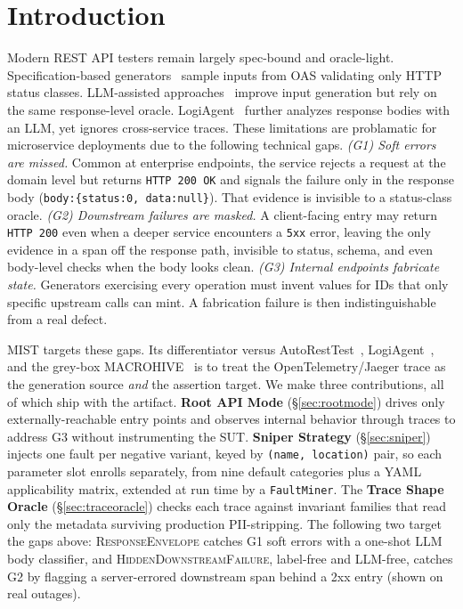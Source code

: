 \documentclass[sigconf,screen,review]{acmart}
\begin{document}
\maketitle

\section{Introduction}\label{sec:intro}

Modern REST API testers remain largely spec-bound and oracle-light. Specification-based generators~\cite{Arcuri2019EvoMasterTOSEM,Atlidakis2019RESTler,MartinLopez2021RESTest,Liu2022MoRest,Kim2023ARATRL,HatfieldDodds2022Schemathesis} sample inputs from  OAS validating only HTTP status classes. LLM-assisted approaches~\cite{Kim2024RESTGPT,Kim2025LlamaRestTest,Stennett2025AutoRestTest} improve input generation but rely on the same response-level oracle. LogiAgent~\cite{Zhang2025LogiAgent} further analyzes response bodies with an LLM, yet ignores cross-service traces. These limitations are problamatic for microservice deployments due to the following technical gaps. \emph{(G1) Soft errors are missed.} Common at enterprise endpoints, the service rejects a request at the domain level but returns \texttt{HTTP 200 OK} and signals the failure only in the response body (\texttt{body:\{status:0, data:null\}}). That evidence is invisible to a status-class oracle. \emph{(G2) Downstream failures are masked.} A client-facing entry may return \texttt{HTTP 200} even when a deeper service encounters a \texttt{5xx} error, leaving the only evidence in a span off the response path, invisible to status, schema, and even body-level checks when the body looks clean. \emph{(G3) Internal endpoints fabricate state.} Generators exercising every operation must invent values for IDs that only specific upstream calls can mint. A fabrication failure is then indistinguishable from a real defect.

MIST targets these gaps. Its differentiator versus AutoRestTest~\cite{Stennett2025AutoRestTest}, LogiAgent~\cite{Zhang2025LogiAgent}, and the grey-box MACROHIVE~\cite{Giamattei2022MACROHIVE} is to treat the OpenTelemetry/Jaeger trace as the generation source \emph{and} the assertion target. We make three contributions, all of which ship with the artifact. \textbf{Root API Mode} (\S\ref{sec:rootmode}) drives only externally-reachable entry points and observes internal behavior through traces to address G3 without instrumenting the SUT. \textbf{Sniper Strategy} (\S\ref{sec:sniper}) injects one fault per negative variant, keyed by \texttt{(name, location)} pair, so each parameter slot enrolls separately, from nine default categories plus a YAML applicability matrix, extended at run time by a \texttt{FaultMiner}. The \textbf{Trace Shape Oracle} (\S\ref{sec:traceoracle}) checks each trace against invariant families that read only the metadata surviving production PII-stripping. The following two target the gaps above: \textsc{ResponseEnvelope} catches G1 soft errors with a one-shot LLM body classifier, and \textsc{HiddenDownstreamFailure}, label-free and LLM-free, catches G2 by flagging a server-errored downstream span behind a 2xx entry (shown on real outages).
\end{document}
